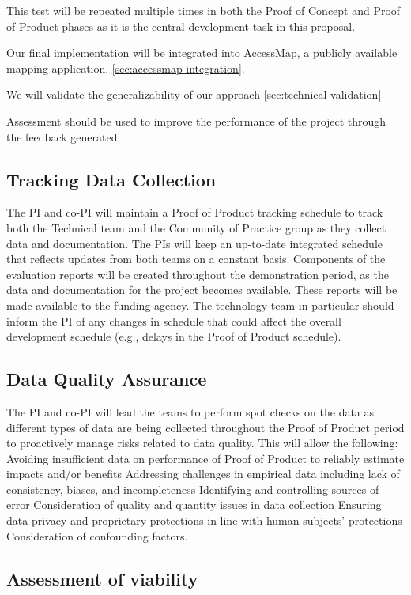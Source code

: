 This test will be repeated multiple times in both the Proof of Concept and Proof of Product phases as it is the central development task in this proposal.


\item[Fully Integrated Prototype (Proof of product)]
Our final implementation will be integrated into AccessMap, a publicly available mapping application. \ref{sec:accessmap-integration}.
\item[Verification of Technical Requirements (Proof of product)]
We will validate the generalizability of our approach  \ref{sec:technical-validation}


Assessment should be used to improve the performance of the project through the feedback generated.

\subsection{Tracking Data Collection}
The PI and co-PI will maintain a Proof of Product tracking schedule to track both the Technical team and the Community of Practice group as they collect data and documentation. The PIs will keep an up-to-date integrated schedule that reflects updates from both teams on a constant basis.  Components of the evaluation reports will be created throughout the demonstration period, as the data and documentation for the project becomes available. These reports will be made available to the funding agency. The technology team in particular should inform the PI of any changes in schedule that could affect the overall development schedule (e.g., delays in the Proof of Product schedule).

\subsection{Data Quality Assurance}

The PI and co-PI will lead the teams to perform spot checks on the data as different types of data are being collected throughout the Proof of Product period to proactively manage risks related to data quality. This will allow the following:
Avoiding insufficient data on performance of Proof of Product to reliably estimate impacts and/or benefits
Addressing challenges in empirical data including lack of consistency, biases, and incompleteness
Identifying and controlling sources of error
Consideration of quality and quantity issues in data collection
Ensuring data privacy and proprietary protections in line with human subjects’ protections
Consideration of confounding factors.


\subsection{Assessment of viability}
